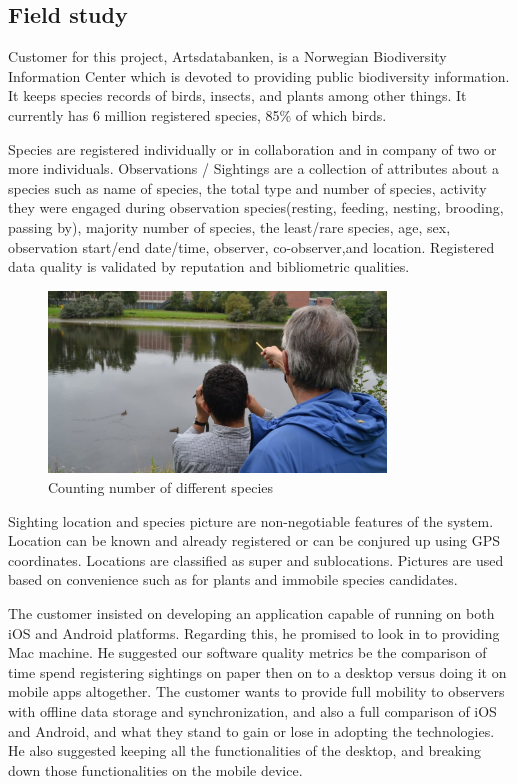 \subsection{Field study}

Customer for this project, Artsdatabanken, is a Norwegian  Biodiversity Information Center which is devoted to providing public biodiversity information. It keeps species records of birds, insects, and plants among other things. It currently has 6 million registered species, 85\% of which birds. \newline

Species are registered individually or in collaboration and in company of two or more individuals. Observations / Sightings are a collection of attributes about a species such as name of species, the total type and number of species, activity they were engaged during observation species(resting, feeding, nesting, brooding, passing by), majority number of species, the least/rare species, age, sex, observation start/end date/time, observer, co-observer,and location. Registered data quality is validated by reputation and bibliometric qualities.\newline

\begin{figure}[htb]
	\centering
	\includegraphics[width=0.8\textwidth]{prestudy/field_study/field_stud.jpg}
	\caption{Counting number of different species}
	\label{fig:field_study}
\end{figure}

Sighting location and species picture are non-negotiable features of the system. Location can be known and already registered or can be conjured up using GPS coordinates. Locations are classified as super and sublocations. Pictures are used based on convenience such as for plants and immobile species candidates.\newline

The customer insisted on developing an application capable of running on both iOS and Android platforms. Regarding this, he promised to look in to providing Mac machine. He suggested our software quality metrics be the comparison of time spend registering sightings on paper then on to a desktop versus doing it on mobile apps altogether. The customer wants to provide full mobility to observers with offline data storage  and synchronization, and also a full comparison of iOS and Android, and what they stand to gain or lose in adopting the technologies. He also suggested keeping all the functionalities of the desktop, and breaking down those functionalities on the mobile device.\newline

